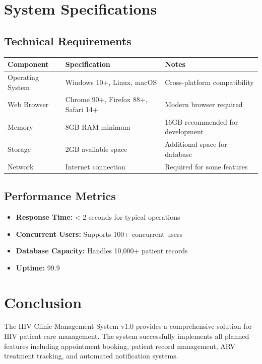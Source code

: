 \documentclass[12pt,a4paper]{article}
\begin{document}
\section{System Specifications}

\subsection{Technical Requirements}

\begin{longtable}{@{}|p{3cm}|p{4cm}|p{7cm}|@{}}
\hline
\textbf{Component} & \textbf{Specification} & \textbf{Notes} \\
\hline
Operating System & Windows 10+, Linux, macOS & Cross-platform compatibility \\
\hline
Web Browser & Chrome 90+, Firefox 88+, Safari 14+ & Modern browser required \\
\hline
Memory & 8GB RAM minimum & 16GB recommended for development \\
\hline
Storage & 2GB available space & Additional space for database \\
\hline
Network & Internet connection & Required for some features \\
\hline
\end{longtable}

\subsection{Performance Metrics}

\begin{itemize}
    \item \textbf{Response Time:} < 2 seconds for typical operations
    \item \textbf{Concurrent Users:} Supports 100+ concurrent users
    \item \textbf{Database Capacity:} Handles 10,000+ patient records
    \item \textbf{Uptime:} 99.9%
\end{itemize}

\section{Conclusion}

The HIV Clinic Management System v1.0 provides a comprehensive solution for HIV patient care management. The system successfully implements all planned features including appointment booking, patient record management, ARV treatment tracking, and automated notification systems.
\end{document}

